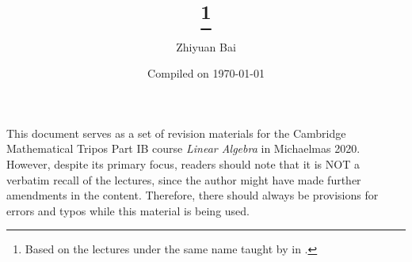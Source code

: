 \documentclass[a4paper]{article}
\title{\triposcourse{}
\thanks{Based on the lectures under the same name taught by \triposlecturer{} in \triposterm{}.}}
\author{Zhiyuan Bai}
\date{Compiled on \today}
\newcommand{\triposcourse}{Linear Algebra}
\newcommand{\triposterm}{Michaelmas 2020}
\newcommand{\tripospart}{IB}
\theoremstyle{plain}
\theoremstyle{definition}
\theoremstyle{remark}
\begin{document}
    \maketitle
    This document serves as a set of revision materials for the Cambridge Mathematical Tripos Part \tripospart{} course \textit{\triposcourse{}} in \triposterm{}.
    However, despite its primary focus, readers should note that it is NOT a verbatim recall of the lectures, since the author might have made further amendments in the content.
    Therefore, there should always be provisions for errors and typos while this material is being used.
    \tableofcontents
    
    
    
    
    
    
    
    
    
    
    
    
    
    
    
    
    
    
    
    
    
    
    
    
\end{document}
